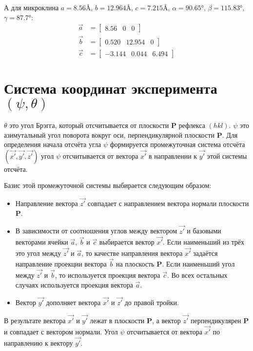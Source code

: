 \documentclass[12pt,a4paper,draft]{article}
\begin{document}
  А для микроклина\cite{microcline}
  $a = 8.56 Å$, $ b = 12.964 Å$, $c = 7.215 Å$,
  $\alpha = 90.65°$, $\beta = 115.83°$, $\gamma = 87.7°$:
  \begin{align}
    \vec{a} &= \begin{bmatrix} 8.56 & 0 & 0 \end{bmatrix} \nonumber \\
    \vec{b} &= \begin{bmatrix} 0.520 & 12.954 & 0 \end{bmatrix} \nonumber \\
    \vec{c} &= \begin{bmatrix} -3.144 & 0.044 & 6.494 \end{bmatrix} \nonumber
  \end{align}


\section{Система координат эксперимента $(\psi, \theta)$}
  $\theta$ это угол Брэгга, который отсчитывается от плоскости $\mathbf{P}$
  рефлекса $(hkl)$.
  $\psi$ это азимутальный угол поворота вокруг оси, перпендикулярной
  плоскости $\mathbf{P}$.
  Для определения начала отсчёта угла $\psi$ формируется промежуточная
  система отсчёта $(\vec{x'}, \vec{y'}, \vec{z'})$
  угол $\psi$ отсчитывается от вектора $\vec{x'}$ в направлении к $\vec{y'}$
  этой системы отсчёта.
  
  Базис этой промежуточной системы выбирается следующим образом:
  \begin{itemize}
    \item Направление вектора $\vec{z'}$ совпадает с направлением вектора
      нормали плоскости $\mathbf{P}$.
    \item В зависимости от соотношения углов между вектором $\vec{z'}$
      и базовыми векторами ячейки $\vec{a}$, $\vec{b}$ и $\vec{c}$ выбирается
      вектор $\vec{x'}$. Если наименьший из трёх это угол между $\vec{z'}$
      и $\vec{a}$, то качестве направления вектора $\vec{x'}$ задаётся
      направление проекции вектора $\vec{b}$ на плоскость $\mathbf{P}$.
      Если наименьший угол между $\vec{z'}$ и $\vec{b}$, то используется
      проекция вектора $\vec{c}$. Во всех остальных случаях используется
      проекция вектора $\vec{a}$.
    \item Вектор $\vec{y'}$ дополняет вектора $\vec{x'}$ и $\vec{z'}$
      до правой тройки.
  \end{itemize}
  В результате вектора $\vec{x'}$ и $\vec{y'}$ лежат в плоскости $\mathbf{P}$,
  а вектор $\vec{z'}$ перпендикулярен $\mathbf{P}$ и совпадает с
  вектором нормали. Угол $\psi$ отсчитывается от вектора $\vec{x'}$
  по направлению к вектору $\vec{y'}$.

\printbibliography
\end{document}
